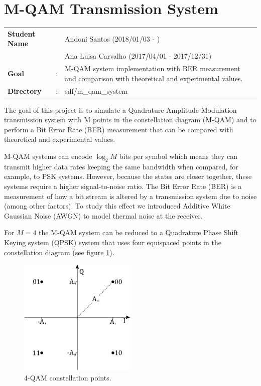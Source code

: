 \clearpage
\section{M-QAM Transmission System}

\begin{refsection}

\begin{tcolorbox}	
	\begin{tabular}{p{2.75cm} p{0.2cm} p{10.5cm}} 	
		\textbf{Student Name}  & & Andoni Santos (2018/01/03 - )\\
							   & & Ana Luisa Carvalho (2017/04/01 - 2017/12/31) \\
		\textbf{Goal}          &:& M-QAM system implementation with BER measurement and comparison with theoretical and experimental values.\\
		\textbf{Directory} &:& sdf/m\_qam\_system
	\end{tabular}
\end{tcolorbox}

The goal of this project is to simulate a Quadrature Amplitude Modulation transmission system with M points in the constellation diagram (M-QAM) and to perform a Bit Error Rate (BER) measurement that can be compared with theoretical and experimental values.

M-QAM systems can encode $\log_2 M$ bits per symbol which means they can transmit higher data rates keeping the same bandwidth when compared, for example, to PSK systems. However, because the states are closer together, these systems require a higher signal-to-noise ratio.
The Bit Error Rate (BER) is a measurement of how a bit stream is altered by a transmission system due to noise (among other factors). To study this effect we introduced Additive White Gaussian Noise (AWGN) to model thermal noise at the receiver.

For $M=4$ the M-QAM system can be reduced to a Quadrature Phase Shift Keying system (QPSK) system that uses four equispaced points in the constellation diagram (see figure \ref{fig:const}).

\begin{figure}[h]
	\centering
	\includegraphics[width=0.5\textwidth]{./sdf/m_qam_system/figures/constellation.pdf}
	\caption{4-QAM constellation points.}
	\label{fig:const}
\end{figure}


\end{refsection}
